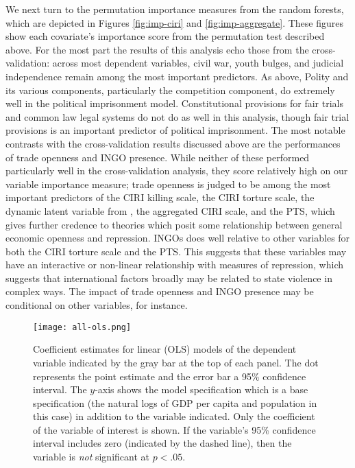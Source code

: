 \documentclass[11pt]{article}
\begin{document}
We next turn to the permutation importance measures from the random forests, which are depicted in Figures \ref{fig:imp-ciri} and \ref{fig:imp-aggregate}. These figures show each covariate's importance score from the permutation test described above. For the most part the results of this analysis echo those from the cross-validation: across most dependent variables, civil war, youth bulges, and judicial independence remain among the most important predictors. As above, Polity and its various components, particularly the competition component, do extremely well in the political imprisonment model. Constitutional provisions for fair trials and common law legal systems do not do as well in this analysis, though fair trial provisions is an important predictor of political imprisonment. The most notable contrasts with the cross-validation results discussed above are the performances of trade openness and INGO presence. While neither of these performed particularly well in the cross-validation analysis, they score relatively high on our variable importance measure; trade openness is judged to be among the most important predictors of the CIRI killing scale, the CIRI torture scale, the dynamic latent variable from \citet{Fariss2013}, the aggregated CIRI scale, and the PTS, which gives further credence to theories which posit some relationship between general economic openness and repression. INGOs does well relative to other variables for both the CIRI torture scale and the PTS. This suggests that these variables may have an interactive or non-linear relationship with measures of repression, which suggests that international factors broadly may be related to state violence in complex ways. The impact of trade openness and INGO presence may be conditional on other variables, for instance. 

\begin{figure}[!htpb]
\texttt{[image: all-ols.png]}
\caption{Coefficient estimates for linear (OLS) models of the dependent variable indicated by the gray bar at the top of each panel. The dot represents the point estimate and the error bar a 95\% confidence interval. The $y$-axis shows the model specification which is a base specification (the natural logs of GDP per capita and population in this case) in addition to the variable indicated. Only the coefficient of the variable of interest is shown. If the variable's 95\% confidence interval includes zero (indicated by the dashed line), then the variable is \textit{not} significant at $p < .05$.}
\label{fig:all-ols}
\end{figure}
\end{document}
